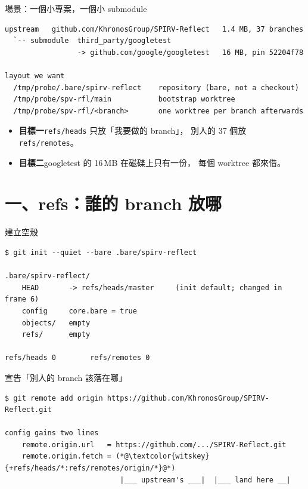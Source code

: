 \begin{frame}[fragile]{場景：一個小專案，一個小 submodule}
\begin{lstlisting}
upstream   github.com/KhronosGroup/SPIRV-Reflect   1.4 MB, 37 branches
  `-- submodule  third_party/googletest
                 -> github.com/google/googletest   16 MB, pin 52204f78

layout we want
  /tmp/probe/.bare/spirv-reflect    repository (bare, not a checkout)
  /tmp/probe/spv-rfl/main           bootstrap worktree
  /tmp/probe/spv-rfl/<branch>       one worktree per branch afterwards
\end{lstlisting}

\begin{itemize}\footnotesize
  \item \textbf{目標一}\quad \texttt{refs/heads} 只放「我要做的 branch」，
        別人的 37 個放 \texttt{refs/remotes}。
  \item \textbf{目標二}\quad googletest 的 16\,MB 在磁碟上只有一份，
        每個 worktree 都來借。
\end{itemize}
\end{frame}

\section{一、refs：誰的 branch 放哪}

\begin{frame}[fragile]{建立空殼}
\begin{lstlisting}
$ git init --quiet --bare .bare/spirv-reflect

.bare/spirv-reflect/
    HEAD       -> refs/heads/master     (init default; changed in frame 6)
    config     core.bare = true
    objects/   empty
    refs/      empty

refs/heads 0        refs/remotes 0
\end{lstlisting}

\end{frame}

\begin{frame}[fragile]{宣告「別人的 branch 該落在哪」}
\begin{lstlisting}
$ git remote add origin https://github.com/KhronosGroup/SPIRV-Reflect.git

config gains two lines
    remote.origin.url   = https://github.com/.../SPIRV-Reflect.git
    remote.origin.fetch = (*@\textcolor{witskey}{+refs/heads/*:refs/remotes/origin/*}@*)
                           |___ upstream's ___|  |___ land here __|
\end{lstlisting}

\end{frame}

